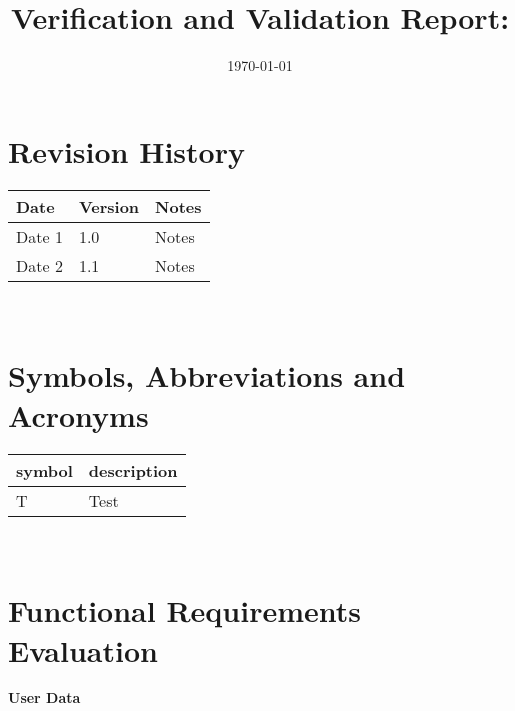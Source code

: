 \documentclass[12pt, titlepage]{article}
\begin{document}
\title{Verification and Validation Report: \progname} 
\author{\authname}
\date{\today}
	
\maketitle


\section{Revision History}

\begin{tabularx}{\textwidth}{p{3cm}p{2cm}X}
\toprule {\bf Date} & {\bf Version} & {\bf Notes}\\
\midrule
Date 1 & 1.0 & Notes\\
Date 2 & 1.1 & Notes\\
\bottomrule
\end{tabularx}

~\newpage

\section{Symbols, Abbreviations and Acronyms}

\renewcommand{\arraystretch}{1.2}
\begin{tabular}{l l} 
  \toprule		
  \textbf{symbol} & \textbf{description}\\
  \midrule 
  T & Test\\
  \bottomrule
\end{tabular}\\


\newpage

\tableofcontents

\listoftables %

\listoffigures %

\newpage


\section{Functional Requirements Evaluation}

\large{\textbf{User Data}}

\normalsize
\end{document}
